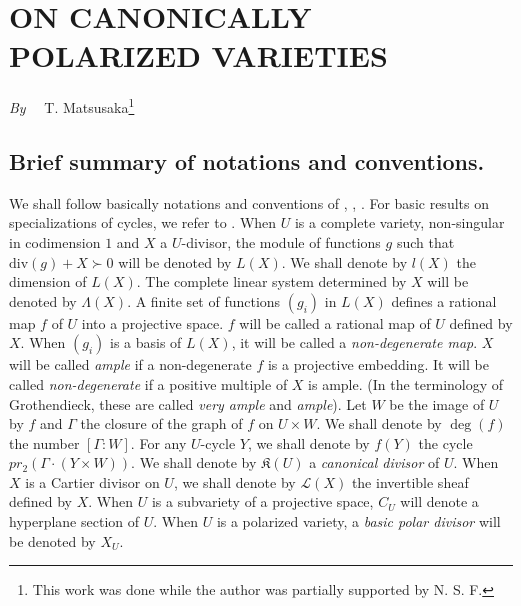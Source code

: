 \chapter[\textsc{T. Matsusaka~:} On Canonically Polarized Varieties]{ON CANONICALLY POLARIZED VARIETIES}\label{art14}

\begin{center}
{\em By}~~ T. Matsusaka\footnote{This work was done while the author was partially supported by N. S. F.}
\end{center}

\setcounter{pageoriginal}{264}
\section*{Brief summary of notations and conventions.}
\pageoriginale


We shall follow basically notations and conventions of \cite{art14-key21}, \cite{art14-key25}, \cite{art14-key32}. For basic results on specializations of cycles, we refer to \cite{art14-key24}. When $U$ is a complete variety, non-singular in codimension $1$ and $X$ a $U$-divisor, the module of functions $g$ such that $\text{div} (g)+X\succ 0$ will be denoted by $L(X)$. We shall denote by $l(X)$ the dimension of $L(X)$. The complete linear system determined by $X$ will be denoted by $\Lambda(X)$. A finite set of functions $(g_{i})$ in $L(X)$ defines a rational map $f$ of $U$ into a projective space. $f$ will be called a {\rm rational map of $U$ defined by $X$.} When $(g_{i})$ is a basis of $L(X)$, it will be called a {\em non-degenerate map}. $X$ will be called {\em ample} if a non-degenerate $f$ is a projective embedding. It will be called {\em non-degenerate} if a positive multiple of $X$ is ample. (In the terminology of Grothendieck, these are called {\em very ample} and {\em ample}). Let $W$ be the image of $U$ by $f$ and $\Gamma$ the closure of the graph of $f$ on $U\times W$. We shall denote by $\deg (f)$ the number $[\Gamma:W]$. For any $U$-cycle $Y$, we shall denote by $f(Y)$ the cycle $pr_{2}(\Gamma\cdot (Y\times W))$. We shall denote by $\mathfrak{K}(U)$  a {\em canonical divisor} of $U$. When $X$ is a Cartier divisor on $U$, we shall denote by $\mathscr{L}(X)$ the invertible sheaf defined by $X$. When $U$ is a subvariety of a projective space, $C_{U}$ will denote a hyperplane section of $U$. When $U$ is a polarized variety, a {\em basic polar divisor} will be denoted by $X_{U}$.

